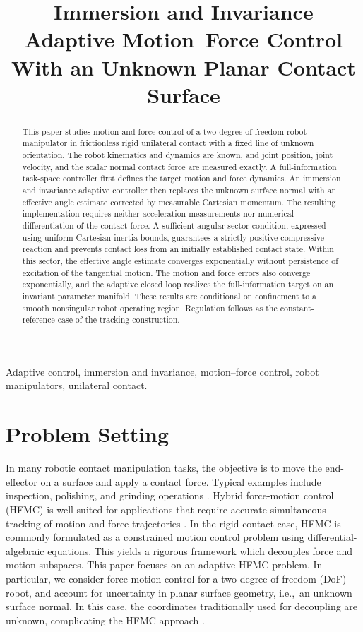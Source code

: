 \documentclass[10pt,journal,letterpaper]{IEEEtran}
\begin{document}
\title{Immersion and Invariance Adaptive Motion--Force Control With an Unknown Planar Contact Surface}
\author{}
\maketitle

\begin{abstract}
This paper studies motion and force control of a two-degree-of-freedom robot manipulator in frictionless rigid unilateral contact with a fixed line of unknown orientation. The robot kinematics and dynamics are known, and joint position, joint velocity, and the scalar normal contact force are measured exactly. A full-information task-space controller first defines the target motion and force dynamics. An immersion and invariance adaptive controller then replaces the unknown surface normal with an effective angle estimate corrected by measurable Cartesian momentum. The resulting implementation requires neither acceleration measurements nor numerical differentiation of the contact force. A sufficient angular-sector condition, expressed using uniform Cartesian inertia bounds, guarantees a strictly positive compressive reaction and prevents contact loss from an initially established contact state. Within this sector, the effective angle estimate converges exponentially without persistence of excitation of the tangential motion. The motion and force errors also converge exponentially, and the adaptive closed loop realizes the full-information target on an invariant parameter manifold. These results are conditional on confinement to a smooth nonsingular robot operating region. Regulation follows as the constant-reference case of the tracking construction.
\end{abstract}

\begin{IEEEkeywords}
Adaptive control, immersion and invariance, motion--force control, robot manipulators, unilateral contact.
\end{IEEEkeywords}

\section{Problem Setting}
In many robotic contact manipulation tasks, the objective is to move the end-effector on a surface and apply a contact force. Typical examples include inspection, polishing, and grinding operations \cite{DycSacKlo22,TzoGraYan20,NagHasHag07}. Hybrid force-motion control (HFMC) is well-suited for applications that require accurate simultaneous tracking of motion and force trajectories \cite{RaiCra81}. In the rigid-contact case, HFMC is commonly formulated as a constrained motion control problem using differential-algebraic equations. This yields a rigorous framework which decouples force and motion subspaces. This paper focuses on an adaptive HFMC problem. In particular, we consider force-motion control for a two-degree-of-freedom (DoF) robot, and account for uncertainty in planar surface geometry, {i.e.},\ an unknown surface normal. In this case, the coordinates traditionally used for decoupling are unknown, complicating the HFMC approach \cite{McCWan88}.
\end{document}
